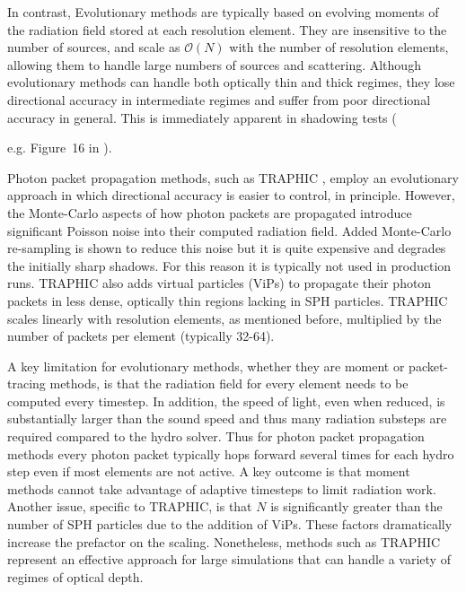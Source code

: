 \documentclass[fleq,usenatbib]{mnras}
\begin{document}
In contrast, Evolutionary methods are typically based on evolving moments of 
the radiation field stored at each resolution element. They are insensitive to 
the number of sources, and scale as $\mathcal{O}(N)$ with the number of 
resolution elements, allowing them to handle large numbers of sources and 
scattering. Although evolutionary methods can handle both optically thin and 
thick regimes, they lose directional accuracy in intermediate regimes and 
suffer from poor directional accuracy in general. This is immediately apparent 
in shadowing tests ({e.g. Figure~16 in \citealt{rosdahlEt13}).

Photon packet propagation methods, such as TRAPHIC \citep{pawlikSchaye08}, 
employ an evolutionary approach in which directional accuracy is easier to 
control, in principle. However, the Monte-Carlo aspects of how photon packets 
are propagated introduce significant Poisson noise into their computed 
radiation field. Added Monte-Carlo re-sampling is shown to reduce this noise 
but it is quite expensive and degrades the initially sharp shadows. For this 
reason  it is typically not used in production runs. TRAPHIC also adds virtual 
particles (ViPs) to propagate their photon packets in less dense, optically 
thin regions lacking in SPH particles. TRAPHIC scales linearly with resolution 
elements, as mentioned before, multiplied by the number of packets per element 
(typically 32-64).

A key limitation for evolutionary methods, whether they are moment or 
packet-tracing methods, is that the radiation field for every element needs to 
be computed every timestep. In addition, the speed of light, even when 
reduced, is substantially larger than the sound speed and thus many radiation 
substeps are required compared to the hydro solver. Thus for photon packet 
propagation methods every photon packet typically hops forward several times 
for each hydro step even if most elements are not active. A key outcome is 
that moment methods cannot take advantage of adaptive timesteps to limit 
radiation work.  Another issue, specific to TRAPHIC, is that $N$ is 
significantly greater than the number of SPH particles due to the addition of 
ViPs. These factors dramatically increase the prefactor on the scaling.  
Nonetheless, methods such as TRAPHIC represent an effective approach for large 
simulations that can handle a variety of regimes of optical depth.

}
\end{document}
